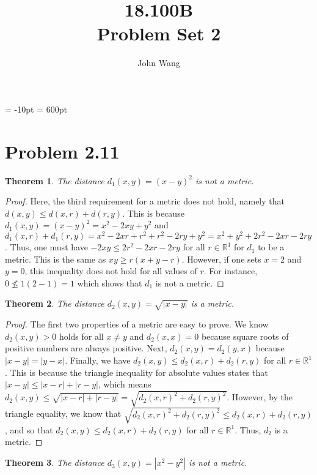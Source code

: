 \documentclass[psamsfonts]{amsart}
\title{18.100B \\
Problem Set 2}
\author{John Wang}
\newtheorem{thm}{Theorem}[section]
\theoremstyle{definition}
\theoremstyle{remark}
\numberwithin{equation}{section}
\begin{document}
\maketitle

\voffset = -10pt
\textheight = 600pt

\section{Problem 2.11}

\begin{thm}
The distance $d_1(x,y) = (x-y)^2$ is not a metric.
\end{thm}

\begin{proof}
Here, the third requirement for a metric does not hold, namely that $d(x,y) \leq d(x,r) + d(r,y)$. This is because $d_1(x,y) = (x-y)^2 = x^2 - 2xy + y^2$ and $d_1(x,r) + d_1(r,y) = x^2 - 2xr + r^2 +r^2 - 2ry + y^2 = x^2 + y^2 + 2r^2 - 2xr - 2ry$. Thus, one must have $-2xy \leq 2r^2 - 2xr - 2ry$ for all $r \in \mathbb{R}^1$ for $d_1$ to be a metric. This is the same as $xy \geq r(x+y-r)$. However, if one sets $ x = 2$ and $ y = 0$, this inequality does not hold for all values of $r$. For instance, $ 0 \not\le 1 ( 2 - 1) = 1 $ which shows that $d_1$ is not a metric. 
\end{proof}

\begin{thm}
The distance $d_2(x,y) = \sqrt{|x-y |}$ is a metric.
\end{thm}

\begin{proof}
The first two properties of a metric are easy to prove. We know $d_2(x,y) > 0$ holds for all $x \neq y$ and $d_2(x,x) = 0$ because square roots of positive numbers are always positive. Next, $d_2(x,y) = d_2(y,x)$ because $|x - y| = |y-x|$. Finally, we have $ d_2(x,y) \leq d_2(x,r) + d_2(r,y)$ for all $r \in \mathbb{R}^1$. This is because the triangle inequality for absolute values states that $|x-y| \leq |x-r| + |r-y|$, which means $d_2(x,y) \leq \sqrt{|x-r| + |r-y|} = \sqrt{ d_2(x,r)^2 + d_2(r,y)^2}$. However, by the triangle equality, we know that $ \sqrt{ d_2(x,r)^2 + d_2(r,y)^2} \leq d_2(x,r) + d_2(r,y)$, and so that $d_2(x,y) \leq d_2(x,r) + d_2(r,y)$ for all $r \in \mathbb{R}^1$.  Thus, $d_2$ is a metric. 
\end{proof}

\begin{thm}
The distance $d_3(x,y) = |x^2 - y^2|$ is not a metric.
\end{thm}
\end{document}
